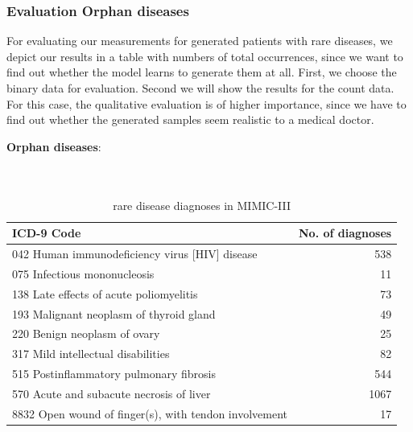 \documentclass[11pt, a4paper]{book}
\begin{document}
\subsubsection{Evaluation Orphan diseases}
For evaluating our measurements for generated patients with rare diseases, we depict our results in a table with numbers of total occurrences, since we want to find out whether the model learns to generate them at all. First, we choose the binary data for evaluation. Second we will show the results for the count data.
For this case, the qualitative evaluation is of higher importance, since we have to find out whether the generated samples seem realistic to a medical doctor.


\textbf{Orphan diseases}:
\\
\\
\\
\begin{table}
\begin{center}
\begin{tabularx}{\textwidth}{X|r}
ICD-9 Code & No. of diagnoses\\
\hline
042 Human immunodeficiency virus [HIV] disease & 538\\
075 Infectious mononucleosis & 11\\
138 Late effects of acute poliomyelitis & 73 \\
193 Malignant neoplasm of thyroid gland & 49 \\
220 Benign neoplasm of ovary & 25\\
317 Mild intellectual disabilities & 82\\
515 Postinflammatory pulmonary fibrosis & 544\\
570 Acute and subacute necrosis of liver & 1067\\
8832 Open wound of finger(s), with tendon involvement & 17\\ 
\end{tabularx}
\end{center}
\caption{\label{tab:rare-MIMIC-III}rare disease diagnoses in MIMIC-III}
\end{table}
\end{document}
